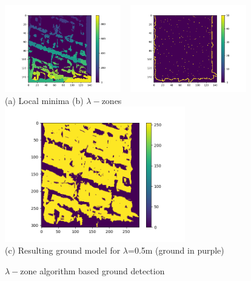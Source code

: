\documentclass{kththesis}
\begin{document}
\begin{figure}[H]
 \centering
        \includegraphics[width=0.45\textwidth]{images/Results/biggest_lambda_zones.png} ~ \includegraphics[width=0.45\textwidth]{images/Results/local_minima.png}  \\
      (a) Local minima \qquad  \qquad \qquad(b) $\lambda-$zones \\
   
    \includegraphics[width=0.7\textwidth]{images/Results/1msquare_zones.png}\\
    (c) Resulting ground model for $\lambda$=0.5m (ground in purple)
    
    \caption{$\lambda-$zone algorithm based ground detection}
    \label{fig:minimaAndGroundModel}
\end{figure}
\end{document}
